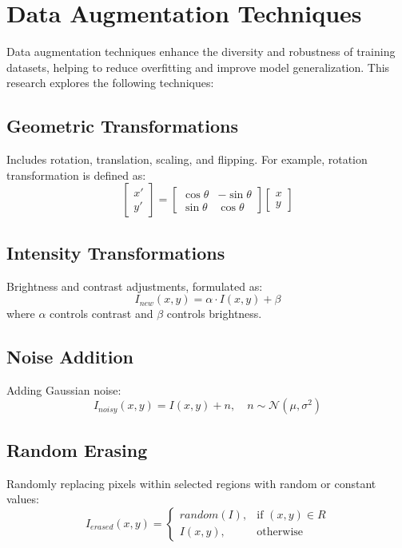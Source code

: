 \section{Data Augmentation Techniques}
Data augmentation techniques enhance the diversity and robustness of training datasets, helping to reduce overfitting and improve model generalization. This research explores the following techniques:

\subsection{Geometric Transformations}
Includes rotation, translation, scaling, and flipping. For example, rotation transformation is defined as:
\begin{equation}
    \begin{bmatrix} x' \\ y' \end{bmatrix} = \begin{bmatrix} \cos\theta & -\sin\theta \\ \sin\theta & \cos\theta \end{bmatrix} \begin{bmatrix} x \\ y \end{bmatrix}
\end{equation}

\subsection{Intensity Transformations}
Brightness and contrast adjustments, formulated as:
\begin{equation}
    I_{new}(x,y) = \alpha \cdot I(x,y) + \beta
\end{equation}
where \(\alpha\) controls contrast and \(\beta\) controls brightness.

\subsection{Noise Addition}
Adding Gaussian noise:
\begin{equation}
    I_{noisy}(x,y) = I(x,y) + n, \quad n \sim \mathcal{N}(\mu, \sigma^2)
\end{equation}

\subsection{Random Erasing}
Randomly replacing pixels within selected regions with random or constant values:
\begin{equation}
    I_{erased}(x,y) = \begin{cases}
    random(I), & \text{if } (x,y) \in R \\
    I(x,y), & \text{otherwise}
    \end{cases}
\end{equation}


